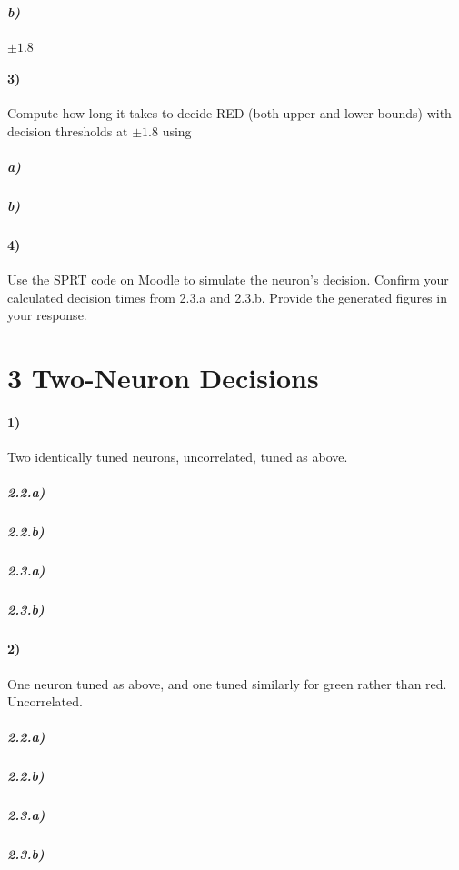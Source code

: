 \documentclass[10pt,letter]{article}
\begin{document}
\subparagraph{b)} $\pm 1.8$

\paragraph{3)} Compute how long it takes to decide RED (both upper and lower bounds) with decision
thresholds at $\pm 1.8$ using

\subparagraph{a)} 

\subparagraph{b)} 

\paragraph{4)} Use the SPRT code on Moodle to simulate the neuron’s decision. Confirm your calculated
decision times from 2.3.a and 2.3.b. Provide the generated figures in your
response.

\section*{3 Two-Neuron Decisions}

\paragraph{1)} Two identically tuned neurons, uncorrelated, tuned as above.

\subparagraph{2.2.a)} 

\subparagraph{2.2.b)} 

\subparagraph{2.3.a)} 

\subparagraph{2.3.b)} 

\paragraph{2)} One neuron tuned as above, and one tuned similarly for green rather than 
    red. Uncorrelated.

\subparagraph{2.2.a)} 

\subparagraph{2.2.b)} 

\subparagraph{2.3.a)} 

\subparagraph{2.3.b)} 
\end{document}
